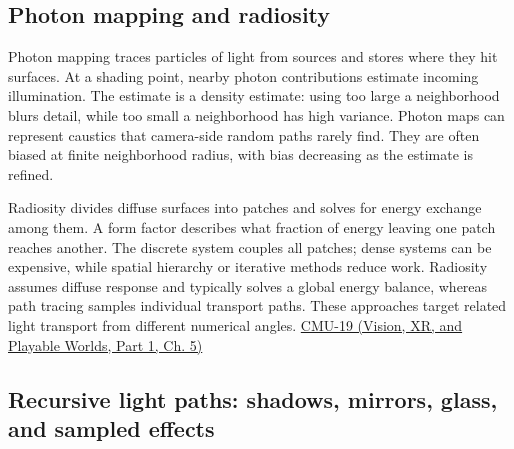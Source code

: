 \subsection{Photon mapping and radiosity}\label{03-visual-computing-i-ch011-photon-mapping-and-radiosity}

\hypertarget{03-visual-computing-i-ch011-photon-mapping-and-radiosity}{}

Photon mapping traces particles of light from sources and stores where they hit surfaces. At a shading point, nearby photon contributions estimate incoming illumination. The estimate is a density estimate: using too large a neighborhood blurs detail, while too small a neighborhood has high variance. Photon maps can represent caustics that camera-side random paths rarely find. They are often biased at finite neighborhood radius, with bias decreasing as the estimate is refined.

Radiosity divides diffuse surfaces into patches and solves for energy exchange among them. A form factor describes what fraction of energy leaving one patch reaches another. The discrete system couples all patches; dense systems can be expensive, while spatial hierarchy or iterative methods reduce work. Radiosity assumes diffuse response and typically solves a global energy balance, whereas path tracing samples individual transport paths. These approaches target related light transport from different numerical angles. \href{../07-Vision-XR-and-Playable-Worlds-P01/main.pdf\#nameddest=04-visual-computing-ii-ch036-cmu-19---variance-reduction}{CMU-19 (Vision, XR, and Playable Worlds, Part 1, Ch. 5)}

\subsection{Recursive light paths: shadows, mirrors, glass, and sampled effects}\label{03-visual-computing-i-ch011-recursive-light-paths-shadows-mirrors-glass-and-sampled-effects}

\hypertarget{03-visual-computing-i-ch011-recursive-light-paths-shadows-mirrors-glass-and-sampled-effects}{}

